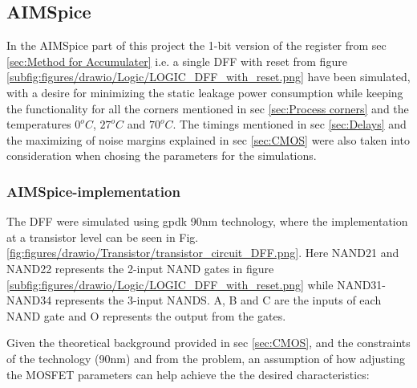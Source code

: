 \subsection{AIMSpice}
In the AIMSpice part of this project the 1-bit version of the register from sec \ref{sec:Method for Accumulater} i.e. a single DFF with reset from figure \ref{subfig:figures/drawio/Logic/LOGIC_DFF_with_reset.png} have been simulated, with a desire for minimizing the static leakage power consumption while keeping the functionality for all the corners mentioned in sec \ref{sec:Process corners} and the temperatures $0^o C$, $27^o C$ and $70^o C$. The timings mentioned in sec \ref{sec:Delays} and the maximizing of noise margins explained in sec \ref{sec:CMOS} were also taken into consideration when chosing the parameters for the simulations.

\subsubsection{AIMSpice-implementation}
The DFF were simulated using gpdk 90nm technology, where the implementation at a transistor level can be seen in Fig. \ref{fig:figures/drawio/Transistor/transistor_circuit_DFF.png}. Here NAND21 and NAND22 represents the 2-input NAND gates in figure \ref{subfig:figures/drawio/Logic/LOGIC_DFF_with_reset.png} while NAND31-NAND34 represents the 3-input NANDS. A, B and C are the inputs of each NAND gate and O represents the output from the gates.


Given the theoretical background provided in sec \ref{sec:CMOS}, and the constraints of the technology (90nm) and from the problem, an assumption of how adjusting the MOSFET parameters can help achieve the the desired characteristics: 

